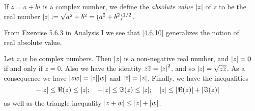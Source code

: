 \begin{defn}\label{4.6.10}
  If \(z = a + bi\) is a complex number, we define the \emph{absolute value} \(\left\lvert z\right\rvert\) of \(z\) to be the real number \(\left\lvert z\right\rvert \coloneqq \sqrt{a^2 + b^2} = (a^2 + b^2)^{1 / 2}\).
\end{defn}

\begin{note}
  From Exercise 5.6.3 in Analysis I we see that \cref{4.6.10} generalizes the notion of real absolute value.
\end{note}

\begin{lem}\label{4.6.11}
  Let \(z, w\) be complex numbers.
  Then \(\left\lvert z\right\rvert\) is a non-negative real number, and \(\left\lvert z\right\rvert = 0\) if and only if \(z = 0\).
  Also we have the identity \(z \overline{z} = \left\lvert z\right\rvert^2\), and so \(\left\lvert z\right\rvert = \sqrt{z \overline{z}}\).
  As a consequence we have \(\abs{zw} = \abs{z} \abs{w}\) and \(\left\lvert\overline{z}\right\rvert = \left\lvert z\right\rvert\).
  Finally, we have the inequalities
  \[
    -\abs{z} \leq \Re(z) \leq \abs{z}; \quad -\abs{z} \leq \Im(z) \leq \abs{z}; \quad \abs{z} \leq \abs{\Re(z)} + \abs{\Im(z)}
  \]
  as well as the triangle inequality \(\left\lvert z + w\right\rvert \leq \left\lvert z\right\rvert + \left\lvert w\right\rvert\).
\end{lem}

